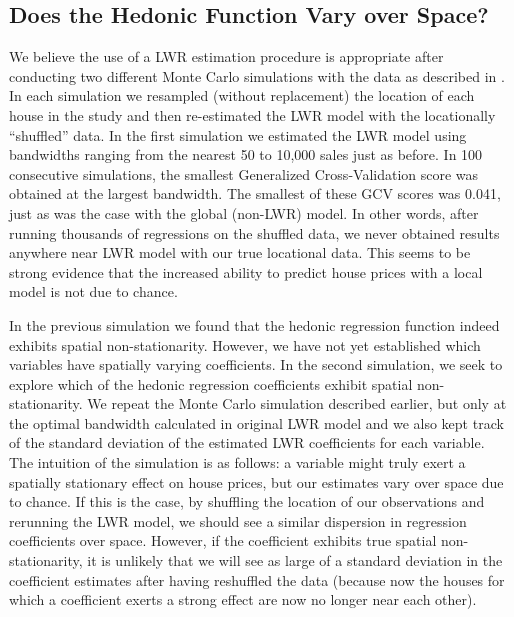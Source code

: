 \documentclass{article}\usepackage{graphicx, color}
\begin{document}
\subsection{Does the Hedonic Function Vary over Space?}
We believe the use of a LWR estimation procedure is appropriate after conducting two different Monte Carlo simulations with the data as described in \citet{Fotheringham2002}. In each simulation we resampled (without replacement) the location of each house in the study and then re-estimated the LWR model with the locationally ``shuffled'' data. In the first simulation we estimated the LWR model using bandwidths ranging from the nearest 50 to 10,000 sales just as before. In 100 consecutive simulations, the smallest Generalized Cross-Validation score was obtained at the largest bandwidth. The smallest of these GCV scores was 0.041, just as was the case with the global (non-LWR) model. In other words, after running thousands of regressions on the shuffled data, we never obtained results anywhere near LWR model with our true locational data. This seems to be strong evidence that the increased ability to predict house prices with a local model is not due to chance. 

In the previous simulation we found that the hedonic regression function indeed exhibits spatial non-stationarity. However, we have not yet established which variables have spatially varying coefficients. In the second simulation, we seek to explore which of the hedonic regression coefficients exhibit spatial non-stationarity. We repeat the Monte Carlo simulation described earlier, but only at the optimal bandwidth calculated in original LWR model and we also kept track of the standard deviation of the estimated LWR coefficients for each variable. The intuition of the simulation is as follows: a variable might truly exert a spatially stationary effect on house prices, but our estimates vary over space due to chance. If this is the case, by shuffling the location of our observations and rerunning the LWR model, we should see a similar dispersion in regression coefficients over space. However, if the coefficient exhibits true spatial non-stationarity, it is unlikely that we will see as large of a standard deviation in the coefficient estimates after having reshuffled the data (because now the houses for which a coefficient exerts a strong effect are now no longer near each other). 
\end{document}
